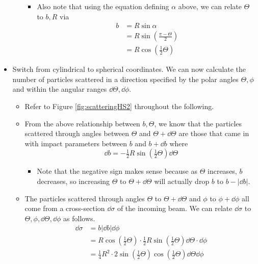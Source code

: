 \documentclass[../notes.tex]{subfiles}
\begin{document}
\begin{itemize}
\begin{itemize}
\begin{itemize}
            \item Also note that using the equation defining $\alpha$ above, we can relate $\Theta$ to $b,R$ via
            \begin{align*}
                b &= R\sin\alpha\\
                &= R\sin(\tfrac{\pi-\Theta}{2})\\
                &= R\cos(\tfrac{1}{2}\Theta)
            \end{align*}
        \end{itemize}
    \end{itemize}
    \item Switch from cylindrical to spherical coordinates. We can now calculate the number of particles scattered in a direction specified by the polar angles $\Theta,\phi$ and within the angular ranges $\dd{\Theta},\dd{\phi}$.
    \begin{itemize}
        \item Refer to Figure \ref{fig:scatteringHS2} throughout the following.
        \item From the above relationship between $b,\Theta$, we know that the particles scattered through angles between $\Theta$ and $\Theta+\dd{\Theta}$ are those that came in with impact parameters between $b$ and $b+\dd{b}$ where
        \begin{equation*}
            \dd{b} = -\tfrac{1}{2}R\sin(\tfrac{1}{2}\Theta)\dd{\Theta}
        \end{equation*}
        \begin{itemize}
            \item Note that the negative sign makes sense because as $\Theta$ increases, $b$ decreases, so increasing $\Theta$ to $\Theta+\dd{\Theta}$ will actually drop $b$ to $b-|\dd{b}|$.
        \end{itemize}
        \item The particles scattered through angles $\Theta$ to $\Theta+\dd{\Theta}$ and $\phi$ to $\phi+\dd{\phi}$ all come from a cross-section $\dd{\sigma}$ of the incoming beam. We can relate $\dd{\sigma}$ to $\Theta,\phi,\dd{\Theta},\dd{\phi}$ as follows.
        \begin{align*}
            \dd{\sigma} &= b|\dd{b}|\dd{\phi}\\
            &= R\cos(\tfrac{1}{2}\Theta)\cdot\tfrac{1}{2}R\sin(\tfrac{1}{2}\Theta)\dd{\Theta}\cdot\dd{\phi}\\
            &= \tfrac{1}{4}R^2\cdot 2\sin(\tfrac{1}{2}\Theta)\cos(\tfrac{1}{2}\Theta)\dd{\Theta}\dd{\phi}\\

\end{align*}
\end{itemize}
\end{itemize}
\end{document}

